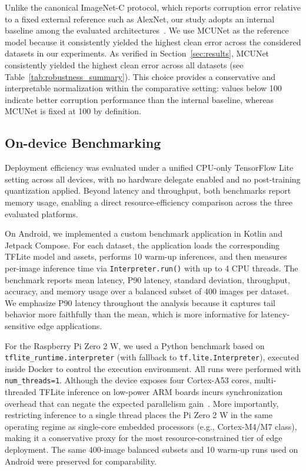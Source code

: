 \documentclass[runningheads]{llncs}
\begin{document}
Unlike the canonical ImageNet-C protocol, which reports corruption error
relative to a fixed external reference such as AlexNet, our study adopts an
internal baseline among the evaluated
architectures~\cite{hendrycks2019benchmarking}. We use MCUNet as the reference
model because it consistently yielded the highest clean error across the
considered datasets in our experiments. As verified in
Section~\ref{sec:results}, MCUNet consistently yielded the highest clean error
across all datasets (see Table~\ref{tab:robustness_summary}). This choice
provides a conservative and interpretable normalization within the comparative
setting: values below 100 indicate better corruption performance than the
internal baseline, whereas MCUNet is fixed at 100 by definition.

\subsection{On-device Benchmarking}

Deployment efficiency was evaluated under a unified CPU-only TensorFlow Lite
setting across all devices, with no hardware delegate enabled and no
post-training quantization applied. Beyond latency and throughput, both
benchmarks report memory usage, enabling a direct resource-efficiency
comparison across the three evaluated platforms.

On Android, we implemented a custom benchmark application in Kotlin and Jetpack
Compose. For each dataset, the application loads the corresponding TFLite
model and assets, performs 10 warm-up inferences, and then measures per-image
inference time via \texttt{Interpreter.run()} with up to 4 CPU threads. The
benchmark reports mean latency, P90 latency, standard deviation, throughput,
accuracy, and memory usage over a balanced subset of 400 images per dataset.
We emphasize P90 latency throughout the analysis because it captures tail
behavior more faithfully than the mean, which is more informative for
latency-sensitive edge applications.

For the Raspberry Pi Zero 2 W, we used a Python benchmark based on
\texttt{tflite\_runtime.interpreter} (with fallback to
\texttt{tf.lite.Interpreter}), executed inside Docker to control the execution
environment. All runs were performed with \texttt{num\_threads=1}. Although
the device exposes four Cortex-A53 cores, multi-threaded TFLite inference on
low-power ARM boards incurs synchronization overhead that can negate the
expected parallelism gain~\cite{tflite_best_practices}. More importantly,
restricting inference to a single thread places the Pi Zero 2 W in the same
operating regime as single-core embedded processors (e.g., Cortex-M4/M7
class), making it a conservative proxy for the most resource-constrained tier
of edge deployment. The same 400-image balanced subsets and 10 warm-up runs
used on Android were preserved for comparability.
\end{document}

